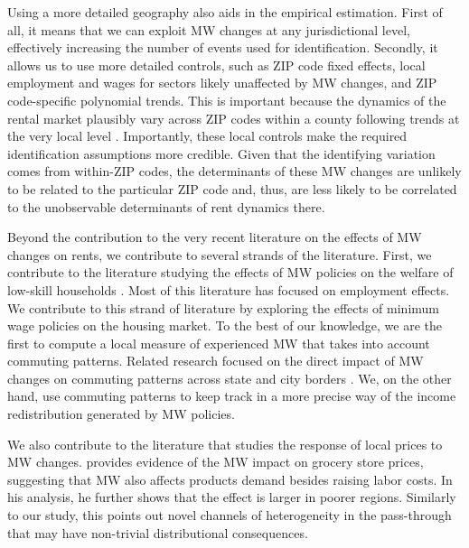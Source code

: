 Using a more detailed geography also aids in the empirical estimation.
First of all, it means that we can exploit MW changes at any jurisdictional level, 
effectively increasing the number of events used for identification.
Secondly, it allows us to use more detailed controls, such as ZIP code fixed effects, 
local employment and wages for sectors likely unaffected by MW changes, and ZIP 
code-specific polynomial trends.
This is important because the dynamics of the rental market plausibly vary across ZIP 
codes within a county following trends at the very local level 
\parencite{AlmagroDominguez2019}.
Importantly, these local controls make the required identification assumptions more credible. 
Given that the identifying variation comes from within-ZIP codes, the determinants of 
these MW changes are unlikely to be related to the particular ZIP code and, thus, are 
less likely to be correlated to the unobservable determinants of rent dynamics there.

Beyond the contribution to the very recent literature on the effects of MW changes on 
rents, we contribute to several strands of the literature.
First, we contribute to the literature studying the effects of MW policies on the welfare 
of low-skill households \parencite[][among others]{DinardoEtAl1995, Lee1999, 
CardKrueger2000, Neumark2006, AutorEtAl2016, CegnizEtAl2019}.
Most of this literature has focused on employment effects. We contribute to this 
strand of literature by exploring the effects of minimum wage policies on the housing 
market.
To the best of our knowledge, we are the first to compute a local measure of experienced 
MW that takes into account commuting patterns.
Related research focused on the direct impact of MW changes on commuting patterns across 
state and city borders \parencite{Mckinnish2017, PerezPerez2018}.
We, on the other hand, use commuting patterns to keep track in a more precise way of the 
income redistribution generated by MW policies.

We also contribute to the literature that studies the response of local prices to MW 
changes. \textcite{LeungForthcoming} provides evidence of the MW impact on grocery store prices, 
suggesting that MW also affects products demand besides raising labor costs. In his 
analysis, he further shows that the effect is larger in poorer regions. Similarly to our 
study, this points out novel channels of heterogeneity in the pass-through that may have 
non-trivial distributional consequences.

